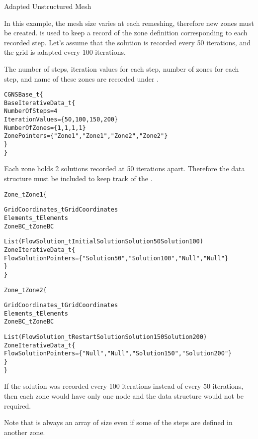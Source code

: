 \newpage
\begin{example}{Adapted Unstructured Mesh}
\label{ex:adaptedunstructuredmesh}

In this example, the mesh size varies at each remeshing, therefore new
zones must be created.
 is used to keep a record of the zone definition
corresponding to each recorded step.
Let's assume that the solution is recorded every 50 iterations, and the
grid is adapted every 100 iterations.

The number of steps, iteration values for each step, number of zones
for each step, and name of these zones are recorded under
.

\begin{alltt}
  CGNSBase\_t \{
    BaseIterativeData\_t \{
      NumberOfSteps = 4
      IterationValues = \{50, 100, 150, 200\}
      NumberOfZones = \{1, 1, 1, 1\}
      ZonePointers = \{"Zone1", "Zone1", "Zone2", "Zone2"\}
    \}
  \}
\end{alltt}

Each zone holds 2 solutions recorded at 50 iterations apart.
Therefore the  data structure must be included
to keep track of the .

\begin{alltt}
  Zone\_t Zone1 \{

    GridCoordinates\_t GridCoordinates
    Elements\_t Elements
    ZoneBC\_t ZoneBC

    List ( FlowSolution\_t InitialSolution Solution50 Solution100 )
    ZoneIterativeData\_t \{
      FlowSolutionPointers = \{"Solution50", "Solution100", "Null", "Null"\}
    \}
  \}

  Zone\_t Zone2 \{

    GridCoordinates\_t GridCoordinates
    Elements\_t Elements
    ZoneBC\_t ZoneBC

    List ( FlowSolution\_t RestartSolution Solution150 Solution200 )
    ZoneIterativeData\_t \{
      FlowSolutionPointers = \{"Null", "Null", "Solution150", "Solution200"\}
    \}
  \}
\end{alltt}
\end{example}

\begin{notes}
\item If the solution was recorded every 100 iterations instead of
      every 50 iterations, then each zone would have only one
       node and the data structure
       would not be required.
\item Note that  is always an array of size
       even if some of the steps are defined in
      another zone.
\end{notes}

